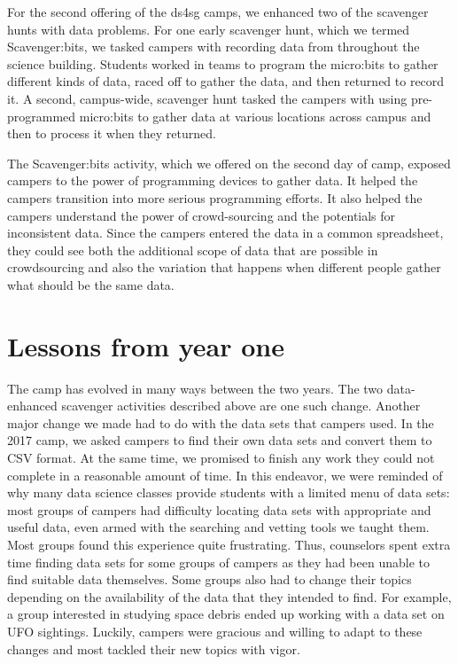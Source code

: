 For the second offering of the ds4sg camps, we enhanced two of the
scavenger hunts with data problems.  For one early scavenger hunt,
which we termed Scavenger:bits, we tasked campers with recording
data from throughout the science building.  Students worked in teams
to program the micro:bits to gather different kinds of data, raced
off to gather the data, and then returned to record it.  A second,
campus-wide, scavenger hunt tasked the campers with using
pre-programmed micro:bits to gather data at various locations across
campus and then to process it when they returned.

The Scavenger:bits activity, which we offered on the second
day of camp, exposed campers to the power of programming devices
to gather data.  It helped the campers transition into more serious
programming efforts.  It also helped the campers understand the
power of crowd-sourcing and the potentials for inconsistent data.
Since the campers entered the data in a common spreadsheet, they could
see both the additional scope of data that are possible in crowdsourcing
and also the variation that happens when different people gather
what should be the same data.

\section{Lessons from year one}

The camp has evolved in many ways between the two years.  The two
data-enhanced scavenger activities described above are one such
change.
Another major change we made had to do with the data sets that
campers used.  In the 2017 camp, we asked campers to find their
own data sets and convert them to CSV format.  At the same time,
we promised to finish any work they could not complete in a reasonable
amount of time.  In this endeavor, we were reminded of why many data
science classes provide students with a limited menu of data sets:
most groups of campers had difficulty locating data sets with
appropriate and useful data, even armed with the searching and
vetting tools we taught them.  Most groups found this experience
quite frustrating.  Thus, counselors spent extra time finding
data sets for some groups of campers as they had been unable to find
suitable data themselves.  Some groups also had to
change their topics depending on the availability of the data that
they intended to find.  For example, a group interested in studying
space debris ended up working with a data set on UFO sightings.
Luckily, campers were gracious and willing to adapt to these changes
and most tackled their new topics with vigor.

